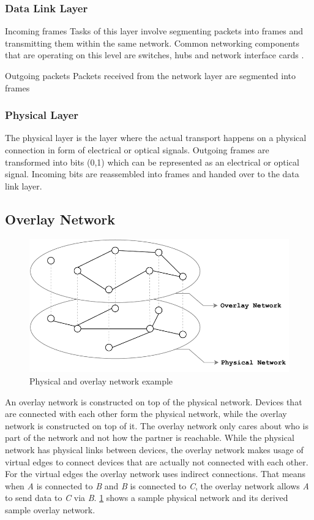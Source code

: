 \subsubsection{Data Link Layer}
Incoming frames\newline
Tasks of this layer involve segmenting packets into frames and transmitting them within the same network.
Common networking components that are operating on this level are switches, hubs and network interface cards \cite{simoneau2006}.

Outgoing packets\newline
Packets received from the network layer are segmented into frames 

\subsubsection{Physical Layer}
The physical layer is the layer where the actual transport happens on a physical connection in form of electrical or optical signals.
Outgoing frames are transformed into bits (0,1) which can be represented as an electrical or optical signal.
Incoming bits are reassembled into frames and handed over to the data link layer.

\subsection{Overlay Network}

\begin{figure}[htb!]
\centering
\includegraphics[width=.5\textwidth]{graphics/physical-vs-overlay-network.pdf}
\caption{Physical and overlay network example}
\label{fig:overlay}
\end{figure}

An overlay network is constructed on top of the physical network. Devices that are connected with each other form the physical network, while the overlay network is constructed on top of it. The overlay network only cares about who is part of the network and not how the partner is reachable. 
While the physical network has physical links between devices, the overlay network makes usage of virtual edges to connect devices that are actually not connected with each other. For the virtual edges the overlay network uses indirect connections. That means when \textit{A} is connected to \textit{B} and \textit{B} is connected to \textit{C}, the overlay network allows \textit{A} to send data to \textit{C} via \textit{B}.
\cref{fig:overlay} shows a sample physical network and its derived sample overlay network.

